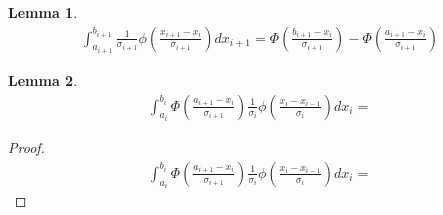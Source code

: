 \documentclass{article}
\newtheorem{lemma}{Lemma}
\begin{document}
\begin{lemma}
  \begin{eqnarray*}
    \int_{a_{i+1}}^{b_{i+1}} \frac{1}{\sigma_{i+1}}\phi\left( \frac{x_{i+1} - x_i}{\sigma_{i+1}} \right) d\!x_{i+1} = \Phi\left(\frac{b_{i+1} - x_i}{\sigma_{i+1}}\right) - \Phi\left(\frac{a_{i+1} - x_i}{\sigma_{i+1}}\right)
  \end{eqnarray*}
\end{lemma}

\begin{lemma}
  \begin{eqnarray*}
    \int_{a_i}^{b_i} \Phi\left( \frac{a_{i+1} - x_i}{\sigma_{i+1}} \right) \frac{1}{\sigma_i} \phi\left(\frac{x_i - x_{i-1}}{\sigma_i}\right) d\!x_i = 
  \end{eqnarray*}
\end{lemma}
\begin{proof}
  \begin{eqnarray*}
    \int_{a_i}^{b_i} \Phi\left( \frac{a_{i+1} - x_i}{\sigma_{i+1}} \right) \frac{1}{\sigma_i} \phi\left(\frac{x_i - x_{i-1}}{\sigma_i}\right) d\!x_i =
  \end{eqnarray*}
\end{proof}
\end{document}
